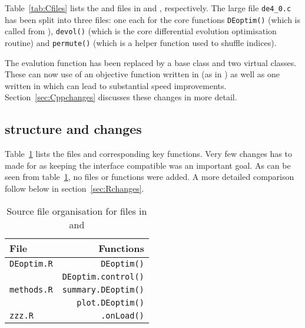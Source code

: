 \documentclass[nojss,shortnames,article]{jss}
\begin{document}
Table~\ref{tab:Cfiles} lists the  and 
files in  and , respectively. 
The large file \verb|de4_0.c| has been split into three files: one each for
the core functions \verb|DEoptim()| (which is called from ),
\verb|devol()| (which is the core differential evolution optimisation
routine) and \verb|permute()| (which is a helper function used to shuffle
indices).  

The evalution function has been replaced by a base class and two virtual
classes. These can now use of an objective function written in 
(as in ) as well as one written in  which can lead
to substantial speed improvements.  Section~\ref{sec:Cppchanges} discusses
these changes in more detail.


\subsection[R structure and changes]{ structure and changes}

Table~\ref{tab:Rfiles} lists the files and corresponding key functions.  Very
few changes has to made for  as keeping the interface compatible
was an important goal. As can be seen from table~\ref{tab:Rfiles}, no files
or functions were added.  A more detailed comparison follow below in
section~\ref{sec:Rchanges}.

\begin{table}[tb]
  \begin{center}
    \begin{tabular}{lr}
      \toprule
      File                                     & Functions \\ 
      \midrule
      \verb|DEoptim.R| \phantom{XXXXX}        & \verb|DEoptim()| \\
                                                & \verb|DEoptim.control()| \\[6pt]
      \verb|methods.R|                         & \verb|summary.DEoptim()| \\
                                                & \verb|plot.DEoptim()| \\[6pt]
      \verb|zzz.R|                             & \verb|.onLoad()| \\
      \bottomrule
    \end{tabular}
    \caption{Source file organisation for  files in 
    and }
    \label{tab:Rfiles}
  \end{center}
\end{table}
\end{document}
